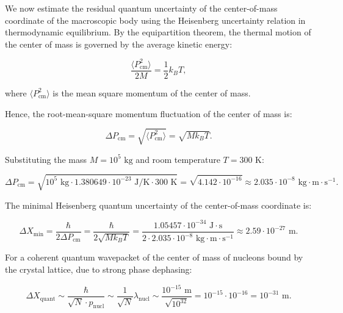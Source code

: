 \documentclass[11pt,a4paper]{article}
\theoremstyle{definition}
\begin{document}
We now estimate the residual quantum uncertainty of the center-of-mass coordinate of the macroscopic body using the Heisenberg uncertainty relation in thermodynamic equilibrium. By the equipartition theorem, the thermal motion of the center of mass is governed by the average kinetic energy:

\begin{equation}\label{eq:5.15}\tag{5.15}
\frac{\langle P_{\text{cm}}^2 \rangle}{2 M} = \frac{1}{2} k_B T,
\end{equation}

where $\langle P_{\text{cm}}^2 \rangle$ is the mean square momentum of the center of mass.

Hence, the root-mean-square momentum fluctuation of the center of mass is:

\begin{equation}\label{eq:5.16}\tag{5.16}
\Delta P_{\text{cm}} = \sqrt{\langle P_{\text{cm}}^2 \rangle} = \sqrt{M k_B T}.
\end{equation}

Substituting the mass $M = 10^5\text{ kg}$ and room temperature $T = 300\text{ K}$:

\begin{equation}\label{eq:5.17}\tag{5.17}
\Delta P_{\text{cm}} = \sqrt{10^5\text{ kg} \cdot 1.380649 \cdot 10^{-23}\text{ J/K} \cdot 300\text{ K}} = \sqrt{4.142 \cdot 10^{-16}} \approx 2.035 \cdot 10^{-8}\text{ kg}\cdot\text{m}\cdot\text{s}^{-1}.
\end{equation}

The minimal Heisenberg quantum uncertainty of the center-of-mass coordinate is:

\begin{equation}\label{eq:5.18}\tag{5.18}
\Delta X_{\text{min}} = \frac{\hbar}{2 \Delta P_{\text{cm}}} = \frac{\hbar}{2 \sqrt{M k_B T}} = \frac{1.05457 \cdot 10^{-34}\text{ J}\cdot\text{s}}{2 \cdot 2.035 \cdot 10^{-8}\text{ kg}\cdot\text{m}\cdot\text{s}^{-1}} \approx 2.59 \cdot 10^{-27}\text{ m}.
\end{equation}

For a coherent quantum wavepacket of the center of mass of nucleons bound by the crystal lattice, due to strong phase dephasing:

\begin{equation}\label{eq:5.19}\tag{5.19}
\Delta X_{\text{quant}} \sim \frac{\hbar}{\sqrt{N} \cdot p_{\text{nucl}}} \sim \frac{1}{\sqrt{N}} \lambda_{\text{nucl}} \sim \frac{10^{-15}\text{ m}}{\sqrt{10^{32}}} = 10^{-15} \cdot 10^{-16} = 10^{-31}\text{ m}.
\end{equation}
\end{document}
